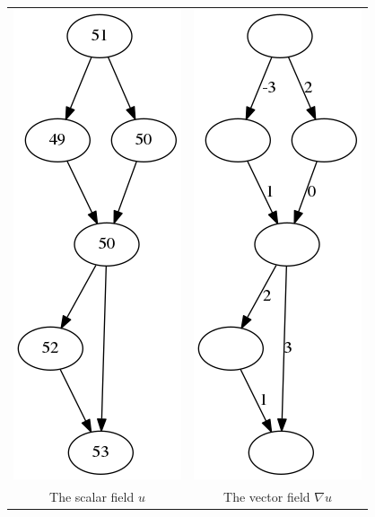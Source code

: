 \begin{tabular}{cc}
	\includegraphics{graph5.png} &
	\includegraphics{graph6.png} \\
	The scalar field $u$ &
	The vector field $\nabla u$
\end{tabular}
